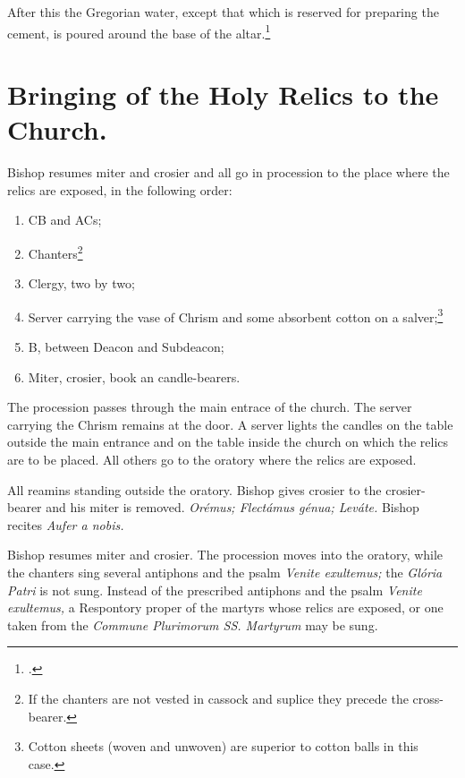 \documentclass[letterpaper]{report}
\begin{document}
{After this the Gregorian water, except that which is reserved for preparing the
cement, is poured around the base of the altar.\footcite[If much water remains
only a small quantity of it is poured around the base of the altar, and what is
left is afterwards poured into the \textit{secrarium.}][footnote 1, p.
78.]{consecranda}

\section{Bringing of the Holy Relics to the Church.}

\rubric Bishop resumes miter and crosier and all go in procession to the place where
the relics are exposed, in the following order:

\begin{enumerate}
    \item CB and ACs;
    \item Chanters\footnote{If the chanters are not vested in cassock and
        suplice they precede the cross-bearer.}
    \item Clergy, two by two;
    \item Server carrying the vase of Chrism and some absorbent cotton on a
        salver;\footnote{Cotton sheets (woven and unwoven) are superior to
        cotton balls in this case.}
    \item B, between Deacon and Subdeacon;
    \item Miter, crosier, book an candle-bearers.
\end{enumerate}

The procession passes through the main entrace of the church. The server
carrying the Chrism remains at the door. A server lights the candles on the
table outside the main entrance and on the table inside the church on which the
relics are to be placed. All others go to the oratory where the relics are
exposed.

\rubric All reamins standing outside the oratory. Bishop gives crosier to the
crosier-bearer and his miter is removed. \textit{Orémus; Flectámus génua;
Leváte.} Bishop recites \textit{Aufer a nobis.}

\rubric Bishop resumes miter and crosier. The procession moves into the oratory,
while the chanters sing several antiphons and the psalm \textit{Venite
exultemus;} the \textit{Glória Patri} is not sung. Instead of the prescribed
antiphons and the psalm \textit{Venite exultemus,} a Respontory proper of the
martyrs whose relics are exposed, or one taken from the \textit{Commune
Plurimorum SS. Martyrum} may be sung.

}
\end{document}
